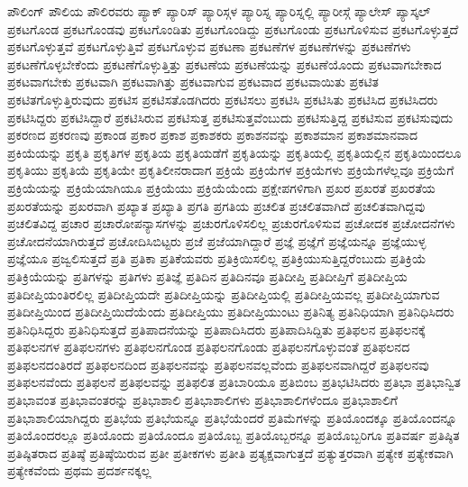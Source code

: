 {ಪೌಲಿಂಗ್
ಪೌಲಿಯ
ಪೌಲಿರವರು
ಪ್ಯಾಕ್
ಪ್ಯಾರಿಸ್
ಪ್ಯಾರಿಸ್ಗಳ
ಪ್ಯಾರಿಸ್ನ
ಪ್ಯಾರಿಸ್ನಲ್ಲಿ
ಪ್ಯಾರೀಸ್ಗೆ
ಪ್ಯಾಲೇಸ್
ಪ್ಯಾಸ್ಕಲ್
ಪ್ರಕಟಗೊಂಡ
ಪ್ರಕಟಗೊಂಡವು
ಪ್ರಕಟಗೊಂಡಿತು
ಪ್ರಕಟಗೊಂಡಿದ್ದು
ಪ್ರಕಟಗೊಂಡು
ಪ್ರಕಟಗೊಳಿಸುವ
ಪ್ರಕಟಗೊಳ್ಳುತ್ತದೆ
ಪ್ರಕಟಗೊಳ್ಳುತ್ತವೆ
ಪ್ರಕಟಗೊಳ್ಳುತ್ತಿವೆ
ಪ್ರಕಟಗೊಳ್ಳುವ
ಪ್ರಕಟಣಾ
ಪ್ರಕಟಣೆಗಳ
ಪ್ರಕಟಣೆಗಳನ್ನು
ಪ್ರಕಟಣೆಗಳು
ಪ್ರಕಟಣೆಗೊಳ್ಳಬೇಕೆಂದು
ಪ್ರಕಟಣೆಗೊಳ್ಳುತ್ತಿತ್ತು
ಪ್ರಕಟಣೆಯ
ಪ್ರಕಟಣೆಯನ್ನು
ಪ್ರಕಟಣೆಯೊಂದು
ಪ್ರಕಟವಾಗಬೇಕಾದ
ಪ್ರಕಟವಾಗಬೇಕು
ಪ್ರಕಟವಾಗಿ
ಪ್ರಕಟವಾಗಿತ್ತು
ಪ್ರಕಟವಾಗುವ
ಪ್ರಕಟವಾದ
ಪ್ರಕಟವಾಯಿತು
ಪ್ರಕಟಿತ
ಪ್ರಕಟಿತಗೊಳ್ಳುತ್ತಿರುವುದು
ಪ್ರಕಟಿಸ
ಪ್ರಕಟಿಸತೊಡಗಿದರು
ಪ್ರಕಟಿಸಲು
ಪ್ರಕಟಿಸಿ
ಪ್ರಕಟಿಸಿತು
ಪ್ರಕಟಿಸಿದ
ಪ್ರಕಟಿಸಿದರು
ಪ್ರಕಟಿಸಿದ್ದರು
ಪ್ರಕಟಿಸಿದ್ದಾರೆ
ಪ್ರಕಟಿಸಿರುವ
ಪ್ರಕಟಿಸುತ್ತ
ಪ್ರಕಟಿಸುತ್ತವೆಂಬುದು
ಪ್ರಕಟಿಸುತ್ತಿದ್ದ
ಪ್ರಕಟಿಸುವ
ಪ್ರಕಟಿಸುವುದು
ಪ್ರಕರಣದ
ಪ್ರಕರಣವು
ಪ್ರಕಾಂಡ
ಪ್ರಕಾರ
ಪ್ರಕಾಶ
ಪ್ರಕಾಶಕರು
ಪ್ರಕಾಶನವನ್ನು
ಪ್ರಕಾಶಮಾನ
ಪ್ರಕಾಶಮಾನವಾದ
ಪ್ರಕಿಯೆಯನ್ನು
ಪ್ರಕೃತಿ
ಪ್ರಕೃತಿಗಳ
ಪ್ರಕೃತಿಯ
ಪ್ರಕೃತಿಯಡೆಗೆ
ಪ್ರಕೃತಿಯನ್ನು
ಪ್ರಕೃತಿಯಲ್ಲಿ
ಪ್ರಕೃತಿಯಲ್ಲಿನ
ಪ್ರಕೃತಿಯಿಂದಲೂ
ಪ್ರಕೃತಿಯು
ಪ್ರಕೃತಿಯೆ
ಪ್ರಕೃತಿಯೇ
ಪ್ರಕೃತಿಲೀನರಾದಾಗ
ಪ್ರಕ್ರಿಯೆ
ಪ್ರಕ್ರಿಯೆಗಳ
ಪ್ರಕ್ರಿಯೆಗಳು
ಪ್ರಕ್ರಿಯೆಗಳೆಲ್ಲವೂ
ಪ್ರಕ್ರಿಯೆಗೆ
ಪ್ರಕ್ರಿಯೆಯನ್ನು
ಪ್ರಕ್ರಿಯೆಯಾಗಿಯೂ
ಪ್ರಕ್ರಿಯೆಯು
ಪ್ರಕ್ರಿಯೆಯೆಂದು
ಪ್ರಕ್ಷೇಪಗಳಿಗಾಗಿ
ಪ್ರಖರ
ಪ್ರಖರತೆ
ಪ್ರಖರತೆಯ
ಪ್ರಖರತೆಯನ್ನು
ಪ್ರಖರವಾಗಿ
ಪ್ರಖ್ಯಾತ
ಪ್ರಖ್ಯಾತಿ
ಪ್ರಗತಿ
ಪ್ರಗತಿಯ
ಪ್ರಚಲಿತ
ಪ್ರಚಲಿತವಾಗಿದೆ
ಪ್ರಚಲಿತವಾಗಿದ್ದವು
ಪ್ರಚಲಿತವಿದ್ದ
ಪ್ರಚಾರ
ಪ್ರಚಾರೋಪನ್ಯಾಸಗಳನ್ನು
ಪ್ರಚುರಗೊಳಿಸಲಿಲ್ಲ
ಪ್ರಚುರಗೊಳಿಸುವ
ಪ್ರಚೋದಕ
ಪ್ರಚೋದನೆಗಳು
ಪ್ರಚೋದನೆಯಾಗಿರುತ್ತದೆ
ಪ್ರಚೋದಿಸಿಬಿಟ್ಟರು
ಪ್ರಜೆ
ಪ್ರಜೆಯಾಗಿದ್ದಾರೆ
ಪ್ರಜ್ಞೆ
ಪ್ರಜ್ಞೆಗೆ
ಪ್ರಜ್ಞೆಯನ್ನೂ
ಪ್ರಜ್ಞೆಯುಳ್ಳ
ಪ್ರಜ್ಞೆಯೂ
ಪ್ರಜ್ವಲಿಸುತ್ತದೆ
ಪ್ರತಿ
ಪ್ರತಿಕಾ
ಪ್ರತಿಕೆಯವರು
ಪ್ರತಿಕ್ರಿಯಿಸಲಿಲ್ಲ
ಪ್ರತಿಕ್ರಿಯುಸುತ್ತಿದ್ದರೆಂಬುದು
ಪ್ರತಿಕ್ರಿಯೆ
ಪ್ರತಿಕ್ರಿಯೆಯನ್ನು
ಪ್ರತಿಗಳನ್ನು
ಪ್ರತಿಗಳು
ಪ್ರತಿಜ್ಞೆ
ಪ್ರತಿದಿನ
ಪ್ರತಿದಿನವೂ
ಪ್ರತಿದೀಪ್ತಿ
ಪ್ರತಿದೀಪ್ತಿಗೆ
ಪ್ರತಿದೀಪ್ತಿಯ
ಪ್ರತಿದೀಪ್ತಿಯಂತಿರಲಿಲ್ಲ
ಪ್ರತಿದೀಪ್ತಿಯದೇ
ಪ್ರತಿದೀಪ್ತಿಯನ್ನು
ಪ್ರತಿದೀಪ್ತಿಯಲ್ಲಿ
ಪ್ರತಿದೀಪ್ತಿಯವಲ್ಲ
ಪ್ರತಿದೀಪ್ತಿಯಾಗುವ
ಪ್ರತಿದೀಪ್ತಿಯಿಂದ
ಪ್ರತಿದೀಪ್ತಿಯಿದೆಯೆಂದು
ಪ್ರತಿದೀಪ್ತಿಯು
ಪ್ರತಿದೀಪ್ತಿಯುಂಟು
ಪ್ರತಿನಿತ್ಯ
ಪ್ರತಿನಿಧಿಯಾಗಿ
ಪ್ರತಿನಿಧಿಸಿದರು
ಪ್ರತಿನಿಧಿಸಿದ್ದರು
ಪ್ರತಿನಿಧಿಸುತ್ತದೆ
ಪ್ರತಿಪಾದನೆಯನ್ನು
ಪ್ರತಿಪಾದಿಸಿದರು
ಪ್ರತಿಪಾದಿಸಿದ್ದಿತು
ಪ್ರತಿಫಲನ
ಪ್ರತಿಫಲನಕ್ಕೆ
ಪ್ರತಿಫಲನಗಳ
ಪ್ರತಿಫಲನಗಳು
ಪ್ರತಿಫಲನಗೊಂಡ
ಪ್ರತಿಫಲನಗೊಂಡು
ಪ್ರತಿಫಲನಗೊಳ್ಳುವಂತೆ
ಪ್ರತಿಫಲನದ
ಪ್ರತಿಫಲನದಂತಿರದೆ
ಪ್ರತಿಫಲನದಿಂದ
ಪ್ರತಿಫಲನವನ್ನು
ಪ್ರತಿಫಲನವಲ್ಲವೆಂದು
ಪ್ರತಿಫಲನವಾಗಿದ್ದರೆ
ಪ್ರತಿಫಲನವು
ಪ್ರತಿಫಲನವೆಂದು
ಪ್ರತಿಫಲನೆ
ಪ್ರತಿಫಲವನ್ನು
ಪ್ರತಿಫಲಿತ
ಪ್ರತಿಬಾರಿಯೂ
ಪ್ರತಿಬಿಂಬ
ಪ್ರತಿಭಟಿಸಿದರು
ಪ್ರತಿಭಾ
ಪ್ರತಿಭಾನ್ವಿತ
ಪ್ರತಿಭಾವಂತ
ಪ್ರತಿಭಾವಂತರನ್ನು
ಪ್ರತಿಭಾಶಾಲಿ
ಪ್ರತಿಭಾಶಾಲಿಗಳು
ಪ್ರತಿಭಾಶಾಲಿಗಳೆಂದೂ
ಪ್ರತಿಭಾಶಾಲಿಗೆ
ಪ್ರತಿಭಾಶಾಲಿಯಾಗಿದ್ದರು
ಪ್ರತಿಭೆಯ
ಪ್ರತಿಭೆಯನ್ನೂ
ಪ್ರತಿಭೆಯೆಂದರೆ
ಪ್ರತಿಮೆಗಳನ್ನು
ಪ್ರತಿಯೊಂದಕ್ಕೂ
ಪ್ರತಿಯೊಂದನ್ನೂ
ಪ್ರತಿಯೊಂದರಲ್ಲೂ
ಪ್ರತಿಯೊಂದು
ಪ್ರತಿಯೊಂದೂ
ಪ್ರತಿಯೊಬ್ಬ
ಪ್ರತಿಯೊಬ್ಬರನ್ನೂ
ಪ್ರತಿಯೊಬ್ಬರಿಗೂ
ಪ್ರತಿವರ್ಷ
ಪ್ರತಿಷ್ಠಿತ
ಪ್ರತಿಷ್ಠಿತರಾದ
ಪ್ರತಿಷ್ಠೆ
ಪ್ರತಿಷ್ಠೆಯಿರುವ
ಪ್ರತೀ
ಪ್ರತೀಕಗಳು
ಪ್ರತೀತಿ
ಪ್ರತ್ಯಕ್ಷವಾಗುತ್ತದೆ
ಪ್ರತ್ಯುತ್ತರವಾಗಿ
ಪ್ರತ್ಯೇಕ
ಪ್ರತ್ಯೇಕವಾಗಿ
ಪ್ರತ್ಯೇಕವೆಂದು
ಪ್ರಥಮ
ಪ್ರದರ್ಶನಕ್ಕಲ್ಲ
}
